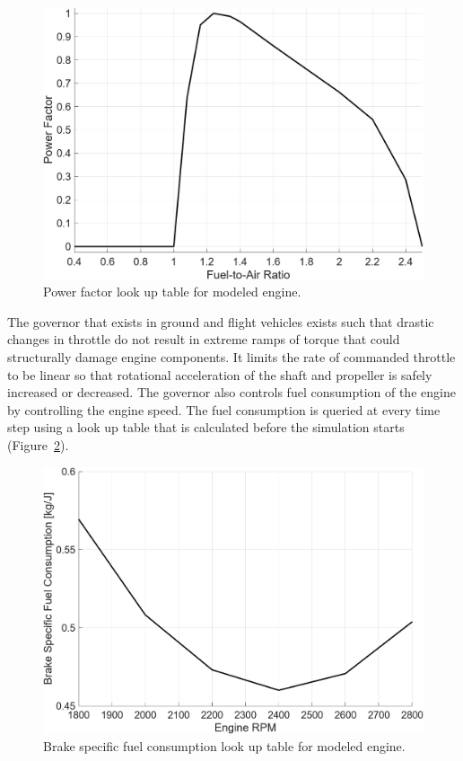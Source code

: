 \begin{figure}[!ht]\label{fig:PFLUT}
    \centering
    \includegraphics[width=.75\linewidth]{Figures/PFLUT.png}
    \caption{Power factor look up table for modeled engine.}
\end{figure}

The governor that exists in ground and flight vehicles exists such that drastic changes in throttle do not result in extreme ramps of torque that could structurally damage engine components. It limits the rate of commanded throttle to be linear so that rotational acceleration of the shaft and propeller is safely increased or decreased. The governor also controls fuel consumption of the engine by controlling the engine speed. The fuel consumption is queried at every time step using a look up table that is calculated before the simulation starts (Figure~\ref{fig:BSFCLUT}).

\begin{figure}[!ht]\label{fig:BSFCLUT}
    \centering
    \includegraphics[width=.75\linewidth]{Figures/BSFCLUT.png}
    \caption{Brake specific fuel consumption look up table for modeled engine.}
\end{figure}

